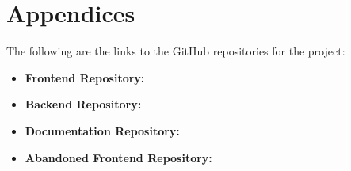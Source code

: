\chapter{Appendices}

\label{appendix}



\label{sec:github-links}

The following are the links to the GitHub repositories for the project:

\begin{itemize}
    \item \textbf{Frontend Repository:} \url{}
    \item \textbf{Backend Repository:} \url{}
    \item \textbf{Documentation Repository:} \url{}
    \item \textbf{Abandoned Frontend Repository:} \url{}
\end{itemize}




\label{sec:ethics-application}





\label{sec:form-recruitment}

